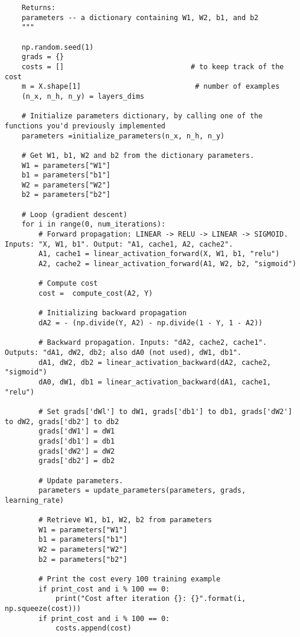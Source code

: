 \begin{verbatim}
    Returns:
    parameters -- a dictionary containing W1, W2, b1, and b2
    """
    
    np.random.seed(1)
    grads = {}
    costs = []                              # to keep track of the cost
    m = X.shape[1]                           # number of examples
    (n_x, n_h, n_y) = layers_dims
    
    # Initialize parameters dictionary, by calling one of the functions you'd previously implemented
    parameters =initialize_parameters(n_x, n_h, n_y)
    
    # Get W1, b1, W2 and b2 from the dictionary parameters.
    W1 = parameters["W1"]
    b1 = parameters["b1"]
    W2 = parameters["W2"]
    b2 = parameters["b2"]
    
    # Loop (gradient descent)
    for i in range(0, num_iterations):
        # Forward propagation: LINEAR -> RELU -> LINEAR -> SIGMOID. Inputs: "X, W1, b1". Output: "A1, cache1, A2, cache2".
        A1, cache1 = linear_activation_forward(X, W1, b1, "relu")
        A2, cache2 = linear_activation_forward(A1, W2, b2, "sigmoid")
        
        # Compute cost
        cost =  compute_cost(A2, Y)
        
        # Initializing backward propagation
        dA2 = - (np.divide(Y, A2) - np.divide(1 - Y, 1 - A2))
        
        # Backward propagation. Inputs: "dA2, cache2, cache1". Outputs: "dA1, dW2, db2; also dA0 (not used), dW1, db1".
        dA1, dW2, db2 = linear_activation_backward(dA2, cache2, "sigmoid")
        dA0, dW1, db1 = linear_activation_backward(dA1, cache1, "relu")
        
        # Set grads['dWl'] to dW1, grads['db1'] to db1, grads['dW2'] to dW2, grads['db2'] to db2
        grads['dW1'] = dW1
        grads['db1'] = db1
        grads['dW2'] = dW2
        grads['db2'] = db2
        
        # Update parameters.
        parameters = update_parameters(parameters, grads, learning_rate)

        # Retrieve W1, b1, W2, b2 from parameters
        W1 = parameters["W1"]
        b1 = parameters["b1"]
        W2 = parameters["W2"]
        b2 = parameters["b2"]
        
        # Print the cost every 100 training example
        if print_cost and i % 100 == 0:
            print("Cost after iteration {}: {}".format(i, np.squeeze(cost)))
        if print_cost and i % 100 == 0:
            costs.append(cost)
       

\end{verbatim}
